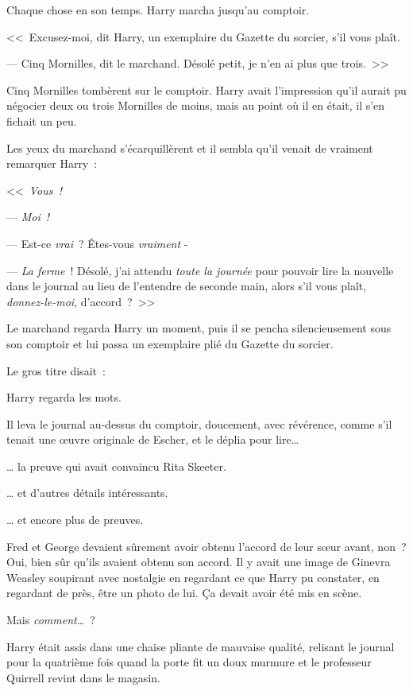Chaque chose en son temps. Harry marcha jusqu'au comptoir.

<<~Excusez-moi, dit Harry, un exemplaire du Gazette du sorcier, s'il vous plaît.

--- Cinq Mornilles, dit le marchand. Désolé petit, je n'en ai plus que trois.~>>

Cinq Mornilles tombèrent sur le comptoir. Harry avait l'impression qu'il aurait pu négocier deux ou trois Mornilles de moins, mais au point où il en était, il s'en fichait un peu.

Les yeux du marchand s'écarquillèrent et il sembla qu'il venait de vraiment remarquer Harry~:

<<~\emph{Vous~!}

--- \emph{Moi~!}

--- Est-ce \emph{vrai}~? Êtes-vous \emph{vraiment} -

--- \emph{La ferme}~! Désolé, j'ai attendu \emph{toute la journée} pour pouvoir lire la nouvelle dans le journal au lieu de l'entendre de seconde main, alors s'il vous plaît, \emph{donnez-le-moi}, d'accord~?~>>

Le marchand regarda Harry un moment, puis il se pencha silencieusement sous son comptoir et lui passa un exemplaire plié du Gazette du sorcier.

Le gros titre disait~:

Harry regarda les mots.

Il leva le journal au-dessus du comptoir, doucement, avec révérence, comme s'il tenait une œuvre originale de Escher, et le déplia pour lire…

… la preuve qui avait convaincu Rita Skeeter.

… et d'autres détails intéressants.

… et encore plus de preuves.

Fred et George devaient sûrement avoir obtenu l'accord de leur sœur avant, non~? Oui, bien sûr qu'ils avaient obtenu son accord. Il y avait une image de Ginevra Weasley soupirant avec nostalgie en regardant ce que Harry pu constater, en regardant de près, être un photo de lui. Ça devait avoir été mis en scène.

Mais \emph{comment…}~?

Harry était assis dans une chaise pliante de mauvaise qualité, relisant le journal pour la quatrième fois quand la porte fit un doux murmure et le professeur Quirrell revint dans le magasin.

